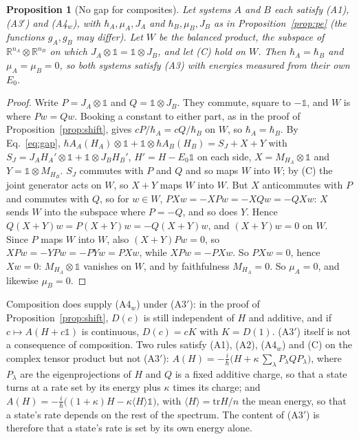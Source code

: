 \documentclass[11pt]{article}
\newtheorem{proposition}[theorem]{Proposition}
\theoremstyle{remark}
\newcommand{\R}{\mathbb{R}}
\newcommand{\one}{\mathbb{1}}
\begin{document}
\begin{proposition}[No gap for composites]\label{prop:nogap}
Let systems $A$ and $B$ each satisfy (A1), (A3$'$) and (A4$_w$), with $\hbar_A,\mu_A,J_A$ and $\hbar_B,\mu_B,J_B$ as in Proposition~\ref{prop:pe} (the functions $g_A,g_B$ may differ). Let $W$ be the balanced product, the subspace of $\R^{n_A}\otimes\R^{n_B}$ on which $J_A\otimes\one=\one\otimes J_B$, and let (C) hold on $W$. Then $\hbar_A=\hbar_B$ and $\mu_A=\mu_B=0$, so both systems satisfy (A3) with energies measured from their own $E_0$.
\end{proposition}

\begin{proof}
Write $P=J_A\otimes\one$ and $Q=\one\otimes J_B$. They commute, square to $-\one$, and $W$ is where $Pw=Qw$. Booking a constant to either part, as in the proof of Proposition~\ref{prop:shift}, gives $cP/\hbar_A=cQ/\hbar_B$ on $W$, so $\hbar_A=\hbar_B$. By Eq.~\eqref{eq:gap}, $\hbar A_A(H_A)\otimes\one+\one\otimes\hbar A_B(H_B)=S_J+X+Y$ with $S_J=J_AH_A'\otimes\one+\one\otimes J_BH_B'$, $H'=H-E_0\one$ on each side, $X=M_{H_A}\otimes\one$ and $Y=\one\otimes M_{H_B}$. $S_J$ commutes with $P$ and $Q$ and so maps $W$ into $W$; by (C) the joint generator acts on $W$, so $X+Y$ maps $W$ into $W$. But $X$ anticommutes with $P$ and commutes with $Q$, so for $w\in W$, $PXw=-XPw=-XQw=-QXw$: $X$ sends $W$ into the subspace where $P=-Q$, and so does $Y$. Hence $Q(X+Y)w=P(X+Y)w=-Q(X+Y)w$, and $(X+Y)w=0$ on $W$. Since $P$ maps $W$ into $W$, also $(X+Y)Pw=0$, so $XPw=-YPw=-PYw=PXw$, while $XPw=-PXw$. So $PXw=0$, hence $Xw=0$: $M_{H_A}\otimes\one$ vanishes on $W$, and by faithfulness $M_{H_A}=0$. So $\mu_A=0$, and likewise $\mu_B=0$.
\end{proof}

Composition does supply (A4$_w$) under (A3$'$): in the proof of Proposition~\ref{prop:shift}, $D(c)$ is still independent of $H$ and additive, and if $c\mapsto A(H+c\one)$ is continuous, $D(c)=cK$ with $K=D(1)$. (A3$'$) itself is not a consequence of composition. Two rules satisfy (A1), (A2), (A4$_w$) and (C) on the complex tensor product but not (A3$'$): $A(H)=-\frac{i}{\hbar}\bigl(H+\kappa\,\textstyle\sum_\lambda P_\lambda QP_\lambda\bigr)$, where $P_\lambda$ are the eigenprojections of $H$ and $Q$ is a fixed additive charge, so that a state turns at a rate set by its energy plus $\kappa$ times its charge; and $A(H)=-\frac{i}{\hbar}\bigl((1+\kappa)H-\kappa\langle H\rangle\one\bigr)$, with $\langle H\rangle=\mathrm{tr}H/n$ the mean energy, so that a state's rate depends on the rest of the spectrum. The content of (A3$'$) is therefore that a state's rate is set by its own energy alone.
\end{document}
